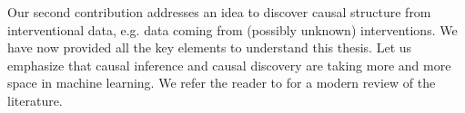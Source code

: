 Our second contribution addresses an idea to discover causal structure from interventional data, e.g. data coming from (possibly unknown) interventions. 
We have now provided all the key elements to understand this thesis. 
Let us emphasize that causal inference and causal discovery are taking more and more space in machine learning. 
We refer the reader to \citep{scholkopf2019causality} for a modern review of the literature.

